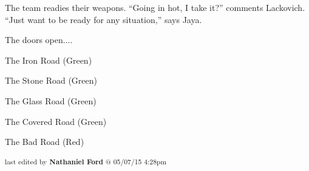 The team readies their weapons.  ``Going in hot, I take it?'' comments Lackovich.  ``Just want to be ready for any situation,'' says Jaya.



The doors open....






The Iron Road (Green)

The Stone Road (Green)

The Glass Road (Green)

The Covered Road (Green)

The Bad Road (Red)



\vspace{\fill}

\begin{flushright}
\textsubscript{last edited by \textbf{Nathaniel Ford} @ 05/07/15 4:28pm}
\end{flushright}

